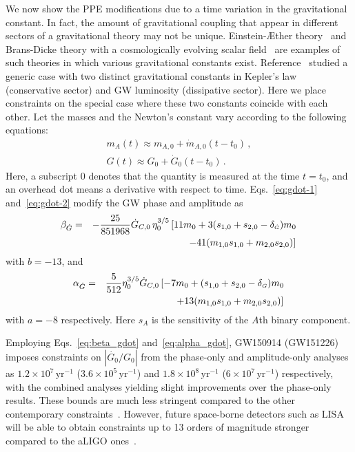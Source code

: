 \documentclass[prd,twocolumn,nofootinbib]{revtex4-1}
\newcommand{\Gdot}{{\mbox{\tiny $\dot G$}}}
\begin{document}
We now show the PPE modifications due to a time variation in the gravitational constant. In fact, the amount of gravitational coupling that appear in different sectors of a  gravitational theory may not be unique. Einstein-\AE ther theory~\cite{Yagi:2013ava} and Brans-Dicke theory with a cosmologically evolving scalar field~\cite{Will2006} are examples of such theories in which various gravitational constants exist. Reference~\cite{Tahura:2018zuq} studied a generic case with two distinct gravitational constants in Kepler's law (conservative sector) and GW luminosity (dissipative sector). Here we place constraints on the special case where these two constants coincide with each other. Let the masses and the Newton's constant vary according to the following equations:
 \begin{eqnarray}\label{eq:gdot-1}
 m_A(t)\approx m_{A,0}+\dot{m}_{A,0}(t-t_0)\,, \\\label{eq:gdot-2}
   \label{eq:3.7a4}  G(t)\approx  G_{0}+\dot{G}_{0}(t-t_0)\,.
 \end{eqnarray}
 Here, a subscript $0$ denotes that the quantity is measured at the time $t=t_0$, and an overhead dot means a derivative with respect to time. Eqs.~\eqref{eq:gdot-1} and~\eqref{eq:gdot-2} modify the GW phase and amplitude as~\cite{Tahura:2018zuq}
 \begin{eqnarray}\label{eq:beta_gdot}
 \beta_{\dot{G}}&=&-\frac{25}{851968}\dot{G}_{C,0}\,\eta_0^{3/5}\left[11m_0 +3(s_{1,0}+s_{2,0}-\delta_\Gdot)m_0 \right. \nonumber \\
 && \left. -41 (m_{1,0}s_{1,0}+m_{2,0}s_{2,0})\right]\,
  \end{eqnarray} 
with $b=-13$, and 
\begin{eqnarray}\label{eq:alpha_gdot}
\label{eq:3.7d2}
 \alpha_{\dot{G}}&=&\frac{5}{512}\eta_0^{3/5}\dot{G}_{C,0}\left[-7m_0+(s_{1,0}+s_{2,0}-\delta_\Gdot)m_0 \right. \nonumber \\
 && \left.+13 (m_{1,0}s_{1,0}+m_{2,0}s_{2,0})\right]\, 
 \end{eqnarray}
with $a=-8$ respectively. Here $s_A$ is the sensitivity of the $A$th binary component.
 
Employing Eqs.~\eqref{eq:beta_gdot} and~\eqref{eq:alpha_gdot}, GW150914 (GW151226) imposes constraints on $|\dot{G_0}/G_0|$ from the phase-only and amplitude-only analyses as $1.2\times10^7\, \mathrm{yr}^{-1}$ ($3.6\times10^5\, \mathrm{yr}^{-1}$) and $1.8\times10^8\, \mathrm{yr}^{-1}$ ($6\times10^7\, \mathrm{yr}^{-1}$) respectively, with the combined analyses yielding slight improvements over the phase-only results.
These bounds are much less stringent compared to the other contemporary constraints~\cite{Will2006}. 
However, future space-borne detectors such as LISA~\cite{Seoane:2013qna,Audley:2017drz} will be able to obtain constraints up to 13 orders of magnitude stronger compared to  the aLIGO ones~\cite{Yunes:2009bv,Chamberlain:2017fjl}.
\end{document}
